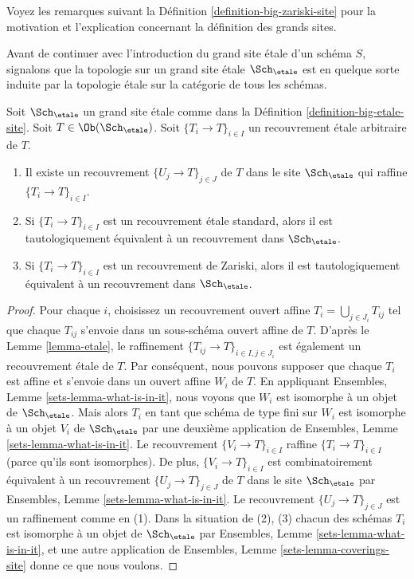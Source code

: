 \noindent
Voyez les remarques suivant la Définition \ref{definition-big-zariski-site} pour la motivation et l'explication concernant la définition des grands sites.

\medskip\noindent
Avant de continuer avec l'introduction du grand site étale d'un schéma $S$, signalons que la topologie sur un grand site étale $\Sch_\etale$ est en quelque sorte induite par la topologie étale sur la catégorie de tous les schémas.

\begin{lemma}
\label{lemma-etale-induced}
Soit $\Sch_\etale$ un grand site étale comme dans la Définition \ref{definition-big-etale-site}. Soit $T \in \Ob(\Sch_\etale)$. Soit $\{T_i \to T\}_{i \in I}$ un recouvrement étale arbitraire de $T$.
\begin{enumerate}
\item Il existe un recouvrement $\{U_j \to T\}_{j \in J}$ de $T$ dans le site $\Sch_\etale$ qui raffine $\{T_i \to T\}_{i \in I}$.
\item Si $\{T_i \to T\}_{i \in I}$ est un recouvrement étale standard, alors il est tautologiquement équivalent à un recouvrement dans $\Sch_\etale$.
\item Si $\{T_i \to T\}_{i \in I}$ est un recouvrement de Zariski, alors il est tautologiquement équivalent à un recouvrement dans $\Sch_\etale$.
\end{enumerate}
\end{lemma}

\begin{proof}
Pour chaque $i$, choisissez un recouvrement ouvert affine $T_i = \bigcup_{j \in J_i} T_{ij}$ tel que chaque $T_{ij}$ s'envoie dans un sous-schéma ouvert affine de $T$. D'après le Lemme \ref{lemma-etale}, le raffinement $\{T_{ij} \to T\}_{i \in I, j \in J_i}$ est également un recouvrement étale de $T$. Par conséquent, nous pouvons supposer que chaque $T_i$ est affine et s'envoie dans un ouvert affine $W_i$ de $T$. En appliquant Ensembles, Lemme \ref{sets-lemma-what-is-in-it}, nous voyons que $W_i$ est isomorphe à un objet de $\Sch_\etale$. Mais alors $T_i$ en tant que schéma de type fini sur $W_i$ est isomorphe à un objet $V_i$ de $\Sch_\etale$ par une deuxième application de Ensembles, Lemme \ref{sets-lemma-what-is-in-it}. Le recouvrement $\{V_i \to T\}_{i \in I}$ raffine $\{T_i \to T\}_{i \in I}$ (parce qu'ils sont isomorphes). De plus, $\{V_i \to T\}_{i \in I}$ est combinatoirement équivalent à un recouvrement $\{U_j \to T\}_{j \in J}$ de $T$ dans le site $\Sch_\etale$ par Ensembles, Lemme \ref{sets-lemma-what-is-in-it}. Le recouvrement $\{U_j \to T\}_{j \in J}$ est un raffinement comme en (1). Dans la situation de (2), (3) chacun des schémas $T_i$ est isomorphe à un objet de $\Sch_\etale$ par Ensembles, Lemme \ref{sets-lemma-what-is-in-it}, et une autre application de Ensembles, Lemme \ref{sets-lemma-coverings-site} donne ce que nous voulons.
\end{proof}

